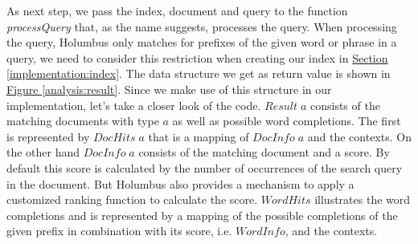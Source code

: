 \documentclass[%
	pdftex,%
	a4paper,%
	oneside,%
	chapterprefix,%
	headsepline,%
	12pt%
]{scrbook}
\newcommand{\Conid}[1]{\mathit{#1}}
\newcommand{\Varid}[1]{\mathit{#1}}
\begin{document}
As next step, we pass the index, document and query to the function
\emph{processQuery} that, as the name suggests, processes the
query. When processing the query, Holumbus only matches for prefixes
of the given word or phrase in a query, we need to consider this
restriction when creating our index in
\hyperref[implementation:index]{Section
  \ref{implementation:index}}. The data structure we get as return
value is shown in \hyperref[analysis:result]{Figure
  \ref{analysis:result}}. Since we make use of this structure in our
implementation, let's take a closer look of the code. \ensuremath{\Conid{Result}\;\Varid{a}}
consists of the matching documents with type \ensuremath{\Varid{a}} as well as possible
word completions. The first is represented by \ensuremath{\Conid{DocHits}\;\Varid{a}} that is a
mapping of \ensuremath{\Conid{DocInfo}\;\Varid{a}} and the contexts. On the other hand \ensuremath{\Conid{DocInfo}\;\Varid{a}}
consists of the matching document and a score. By default this score
is calculated by the number of occurrences of the search query in the
document. But Holumbus also provides a mechanism to apply a customized
ranking function to calculate the score. \ensuremath{\Conid{WordHits}} illustrates the
word completions and is represented by a mapping of the possible completions
of the given prefix in combination with its score, i.e. \ensuremath{\Conid{WordInfo}}, and the contexts.\\
\end{document}
